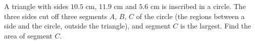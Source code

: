 A triangle with sides $10.5$ cm, $11.9$ cm and $5.6$ cm is inscribed in a circle. The three sides cut off three segments $A$, $B$, $C$ of the circle (the regions between a side and the circle, outside the triangle), and segment $C$ is the largest. Find the area of segment $C$.

